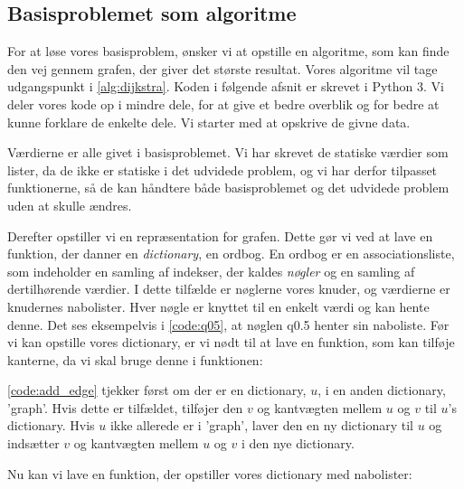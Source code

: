 \subsection{Basisproblemet som algoritme}
For at løse vores basisproblem, ønsker vi at opstille en algoritme, som kan finde den vej gennem grafen, der giver det største resultat. Vores algoritme vil tage udgangspunkt i \autoref{alg:dijkstra}. Koden i følgende afsnit er skrevet i Python 3. Vi deler vores kode op i mindre dele, for at give et bedre overblik og for bedre at kunne forklare de enkelte dele. Vi starter med at opskrive de givne data. 



Værdierne er alle givet i basisproblemet. Vi har skrevet de statiske værdier som lister, da de ikke er statiske i det udvidede problem, og vi har derfor tilpasset funktionerne, så de kan håndtere både basisproblemet og det udvidede problem uden at skulle ændres. 

Derefter opstiller vi en repræsentation for grafen. Dette gør vi ved at lave en funktion, der danner en \emph{dictionary}, en ordbog. En ordbog er en associationsliste, som indeholder en samling af indekser, der kaldes \emph{nøgler} og en samling af dertilhørende værdier. I dette tilfælde er nøglerne vores knuder, og
værdierne er knudernes nabolister. Hver nøgle er knyttet til en enkelt værdi og kan hente denne. Det ses eksempelvis i \autoref{code:q05}, at nøglen q0.5 henter sin naboliste.
Før vi kan opstille vores dictionary, er vi nødt til at lave en funktion, som kan tilføje kanterne, da vi skal bruge denne i funktionen:



\autoref{code:add_edge} tjekker først om der er en dictionary, $u$, i en anden dictionary, 'graph'. Hvis dette er tilfældet, tilføjer den $v$ og kantvægten mellem $u$ og $v$ til  $u$'s dictionary. Hvis $u$ ikke allerede er i 'graph', laver den en ny dictionary til $u$ og indsætter $v$ og kantvægten mellem $u$ og $v$ i den nye dictionary.

Nu kan vi lave en funktion, der opstiller vores dictionary med nabolister:



